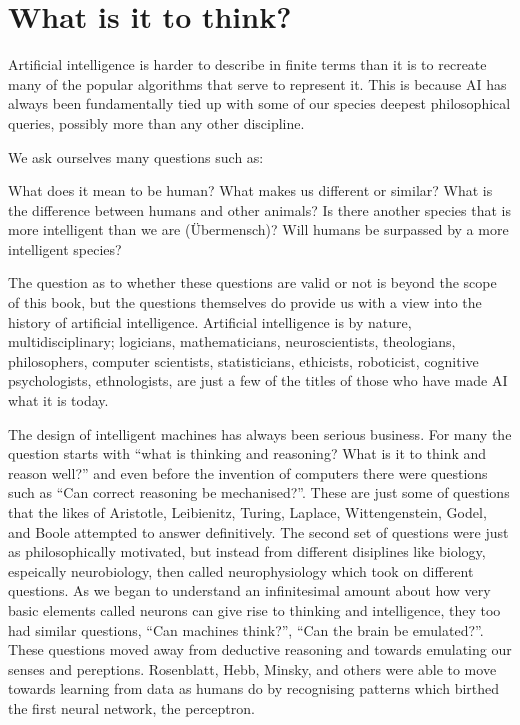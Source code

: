 \documentclass[]{book}
\theoremstyle{definition}
\theoremstyle{definition}
\theoremstyle{definition}
\theoremstyle{remark}
\begin{document}
\section{What is it to think?}\label{what-is-it-to-think}

Artificial intelligence is harder to describe in finite terms than it is
to recreate many of the popular algorithms that serve to represent it.
This is because AI has always been fundamentally tied up with some of
our species deepest philosophical queries, possibly more than any other
discipline.

We ask ourselves many questions such as:

What does it mean to be human? What makes us different or similar? What
is the difference between humans and other animals? Is there another
species that is more intelligent than we are (Übermensch)? Will humans
be surpassed by a more intelligent species?

The question as to whether these questions are valid or not is beyond
the scope of this book, but the questions themselves do provide us with
a view into the history of artificial intelligence. Artificial
intelligence is by nature, multidisciplinary; logicians, mathematicians,
neuroscientists, theologians, philosophers, computer scientists,
statisticians, ethicists, roboticist, cognitive psychologists,
ethnologists, are just a few of the titles of those who have made AI
what it is today.

The design of intelligent machines has always been serious business. For
many the question starts with ``what is thinking and reasoning? What is
it to think and reason well?'' and even before the invention of
computers there were questions such as ``Can correct reasoning be
mechanised?''. These are just some of questions that the likes of
Aristotle, Leibienitz, Turing, Laplace, Wittengenstein, Godel, and Boole
attempted to answer definitively. The second set of questions were just
as philosophically motivated, but instead from different disiplines like
biology, espeically neurobiology, then called neurophysiology which took
on different questions. As we began to understand an infinitesimal
amount about how very basic elements called neurons can give rise to
thinking and intelligence, they too had similar questions, ``Can
machines think?'', ``Can the brain be emulated?''. These questions moved
away from deductive reasoning and towards emulating our senses and
pereptions. Rosenblatt, Hebb, Minsky, and others were able to move
towards learning from data as humans do by recognising patterns which
birthed the first neural network, the perceptron.
\end{document}
